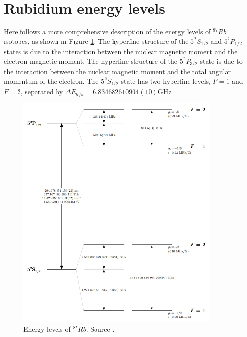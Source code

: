 \pagebreak
\section{Rubidium energy levels}
\label{appendix:Rubidium-energy-levels}

Here follows a more comprehensive description of the energy levels of $^{87}Rb$ isotopes, as shown in Figure \ref{fig:Rubidium-energy-levels}.
The hyperfine structure of the $5^2S_{1/2}$ and $5^2P_{1/2}$ states is due to the interaction between the nuclear magnetic moment and the electron magnetic moment.
The hyperfine structure of the $5^2P_{3/2}$ state is due to the interaction between the nuclear magnetic moment and the total angular momentum of the electron.
The $5^2S_{1/2}$ state has two hyperfine levels, $F=1$ and $F=2$, separated by $\Delta E_{hfs} = 6.834682610904(10) \text{GHz}$.

\begin{figure}[H]
    \centering
    \includegraphics[width=0.9\textwidth, max width=\linewidth]{img/levels-Rubidium.png}
    \caption{Energy levels of $^{87}Rb$. Source \cite{ALKALINI}.}
    \label{fig:Rubidium-energy-levels}
\end{figure}

